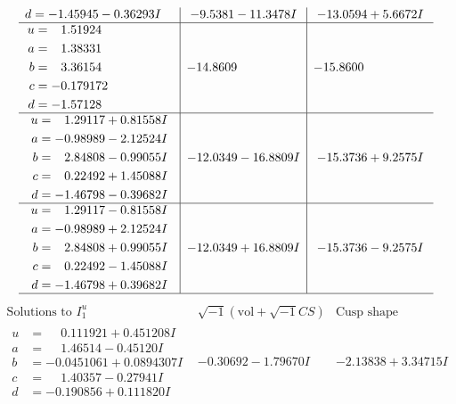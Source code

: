 \documentclass[1p]{elsarticle_modified}
\theoremstyle{definition}
\newcommand{\I}{\sqrt{-1}}
\begin{document}
$$\begin{array}{c|c|c}
\begin{aligned}
d &= -1.45945 - 0.36293 I\end{aligned}
 & -9.5381 - 11.3478 I & -13.0594 + 5.6672 I \\ \hline\begin{aligned}
u &= \phantom{-}1.51924\phantom{ +0.000000I} \\
a &= \phantom{-}1.38331\phantom{ +0.000000I} \\
b &= \phantom{-}3.36154\phantom{ +0.000000I} \\
c &= -0.179172\phantom{ +0.000000I} \\
d &= -1.57128\phantom{ +0.000000I}\end{aligned}
 & -14.8609\phantom{ +0.000000I} & -15.8600\phantom{ +0.000000I} \\ \hline\begin{aligned}
u &= \phantom{-}1.29117 + 0.81558 I \\
a &= -0.98989 - 2.12524 I \\
b &= \phantom{-}2.84808 - 0.99055 I \\
c &= \phantom{-}0.22492 + 1.45088 I \\
d &= -1.46798 - 0.39682 I\end{aligned}
 & -12.0349 - 16.8809 I & -15.3736 + 9.2575 I \\ \hline\begin{aligned}
u &= \phantom{-}1.29117 - 0.81558 I \\
a &= -0.98989 + 2.12524 I \\
b &= \phantom{-}2.84808 + 0.99055 I \\
c &= \phantom{-}0.22492 - 1.45088 I \\
d &= -1.46798 + 0.39682 I\end{aligned}
 & -12.0349 + 16.8809 I & -15.3736 - 9.2575 I\\
 \hline 
 \end{array}$$\newpage$$\begin{array}{c|c|c}  
\text{Solutions to }I^u_{1}& \I (\text{vol} + \sqrt{-1}CS) & \text{Cusp shape}\\
 \hline 
\begin{aligned}
u &= \phantom{-}0.111921 + 0.451208 I \\
a &= \phantom{-}1.46514 - 0.45120 I \\
b &= -0.0451061 + 0.0894307 I \\
c &= \phantom{-}1.40357 - 0.27941 I \\
d &= -0.190856 + 0.111820 I\end{aligned}
 & -0.30692 - 1.79670 I & -2.13838 + 3.34715 I \\ \hline\begin{aligned}

\end{aligned}
\end{array}$$
\end{document}
